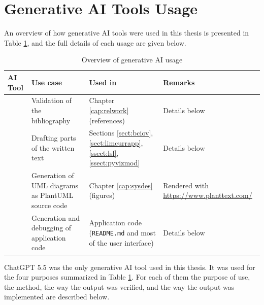 \newpage
\section*{Generative AI Tools Usage}
\label{genAIUsage}

An overview of how generative AI tools were used in this thesis is presented in Table \ref{tab:genAIOverview}, and the full details of each usage are given below.

\renewcommand{\arraystretch}{1.3}

\begin{table}[h!]
    \centering
    \begin{tabularx}{\textwidth}{|
        >{\centering\arraybackslash}m{2.8cm}|
        X|X|X|}
        \hline
        \rowcolor{blue!20}
        AI Tool & Use case & Used in & Remarks \\
        \hline

        \multirow[t]{4}{=}{\centering ChatGPT 5.5}
        & Validation of the bibliography
        & Chapter \ref{cap:relwork} (references)
        & Details below \\
        \cline{2-4}

        & Drafting parts of the written text
        & Sections \ref{sect:bciov}, \ref{sect:limcurrapp},
        \ref{ssect:lsl}, \ref{ssect:pyvizmod}
        & Details below \\
        \cline{2-4}

        & Generation of UML diagrams as PlantUML source code
        & Chapter \ref{cap:sysdes} (figures)
        & Rendered with \url{https://www.planttext.com/} \\
        \cline{2-4}

        & Generation and debugging of application code
        & Application code (\texttt{README.md} and most of the user interface)
        & Details below \\
        \hline
    \end{tabularx}

    \caption{Overview of generative AI usage}
    \label{tab:genAIOverview}
\end{table}

ChatGPT 5.5 was the only generative AI tool used in this thesis. It was used for the four purposes summarized in Table \ref{tab:genAIOverview}. For each of them the purpose of use, the method, the way the output was verified, and the way the output was implemented are described below.

